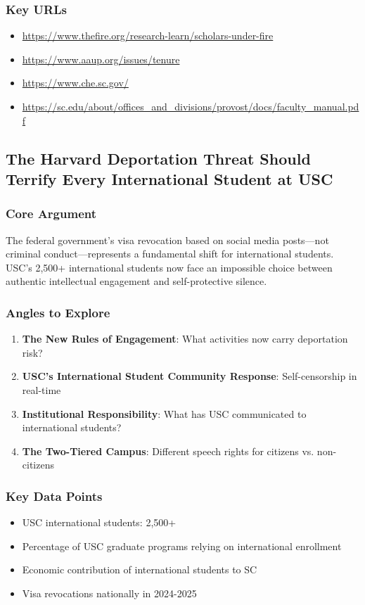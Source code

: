 \documentclass[11pt,letterpaper]{article}
\begin{document}
\subsubsection*{Key URLs}
\begin{itemize}[noitemsep]
    \item \url{https://www.thefire.org/research-learn/scholars-under-fire}
    \item \url{https://www.aaup.org/issues/tenure}
    \item \url{https://www.che.sc.gov/}
    \item \url{https://sc.edu/about/offices_and_divisions/provost/docs/faculty_manual.pdf}
\end{itemize}

\newpage
\subsection{The Harvard Deportation Threat Should Terrify Every International Student at USC}

\subsubsection*{Core Argument}
The federal government's visa revocation based on social media posts---not criminal conduct---represents a fundamental shift for international students. USC's 2,500+ international students now face an impossible choice between authentic intellectual engagement and self-protective silence.

\subsubsection*{Angles to Explore}
\begin{enumerate}[noitemsep]
    \item \textbf{The New Rules of Engagement}: What activities now carry deportation risk?
    \item \textbf{USC's International Student Community Response}: Self-censorship in real-time
    \item \textbf{Institutional Responsibility}: What has USC communicated to international students?
    \item \textbf{The Two-Tiered Campus}: Different speech rights for citizens vs. non-citizens
\end{enumerate}

\subsubsection*{Key Data Points}
\begin{itemize}[noitemsep]
    \item USC international students: 2,500+
    \item Percentage of USC graduate programs relying on international enrollment
    \item Economic contribution of international students to SC
    \item Visa revocations nationally in 2024-2025
\end{itemize}
\end{document}
